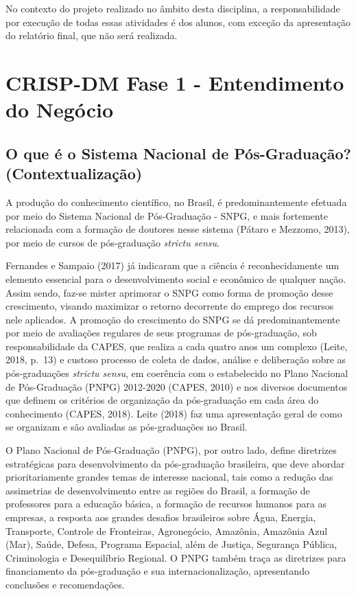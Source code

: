 \documentclass[]{article}
\begin{document}
No contexto do projeto realizado no âmbito desta disciplina, a
responsabilidade por execução de todas essas atividades é dos alunos,
com exceção da apresentação do relatório final, que não será realizada.

\section{CRISP-DM Fase 1 - Entendimento do
Negócio}\label{crisp-dm-fase-1---entendimento-do-negocio}

\subsection{O que é o Sistema Nacional de Pós-Graduação?
(Contextualização)}\label{o-que-e-o-sistema-nacional-de-pos-graduacao-contextualizacao}

A produção do conhecimento científico, no Brasil, é predominantemente
efetuada por meio do Sistema Nacional de Pós-Graduação - SNPG, e mais
fortemente relacionada com a formação de doutores nesse sistema (Pátaro
e Mezzomo, 2013), por meio de cursos de pós-graduação \emph{strictu
sensu}.

Fernandes e Sampaio (2017) já indicaram que a ciência é reconhecidamente
um elemento essencial para o desenvolvimento social e econômico de
qualquer nação. Assim sendo, faz-se mister aprimorar o SNPG como forma
de promoção desse crescimento, visando maximizar o retorno decorrente do
emprego dos recursos nele aplicados. A promoção do crescimento do SNPG
se dá predominantemente por meio de avaliações regulares de seus
programas de pós-graduação, sob responsabilidade da CAPES, que realiza a
cada quatro anos um complexo (Leite, 2018, p.~13) e custoso processo de
coleta de dados, análise e deliberação sobre as pós-graduações
\emph{strictu sensu}, em coerência com o estabelecido no Plano Nacional
de Pós-Graduação (PNPG) 2012-2020 (CAPES, 2010) e nos diversos
documentos que definem os critérios de organização da pós-graduação em
cada área do conhecimento (CAPES, 2018). Leite (2018) faz uma
apresentação geral de como se organizam e são avaliadas as
pós-graduações no Brasil.

O Plano Nacional de Pós-Graduação (PNPG), por outro lado, define
diretrizes estratégicas para desenvolvimento da pós-graduação
brasileira, que deve abordar prioritariamente grandes temas de interesse
nacional, tais como a redução das assimetrias de desenvolvimento entre
as regiões do Brasil, a formação de professores para a educação básica,
a formação de recursos humanos para as empresas, a resposta aos grandes
desafios brasileiros sobre Água, Energia, Transporte, Controle de
Fronteiras, Agronegócio, Amazônia, Amazônia Azul (Mar), Saúde, Defesa,
Programa Espacial, além de Justiça, Segurança Pública, Criminologia e
Desequilíbrio Regional. O PNPG também traça as diretrizes para
financiamento da pós-graduação e sua internacionalização, apresentando
conclusões e recomendações.
\end{document}
